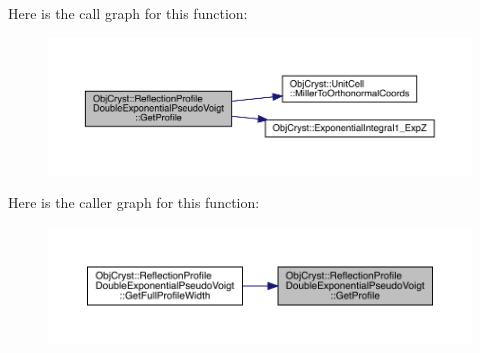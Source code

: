 Here is the call graph for this function\+:
\nopagebreak
\begin{figure}[H]
\begin{center}
\leavevmode
\includegraphics[width=350pt]{class_obj_cryst_1_1_reflection_profile_double_exponential_pseudo_voigt_a4673785fae1ffdcc0a9c2402e8c4af8b_cgraph}
\end{center}
\end{figure}
Here is the caller graph for this function\+:
\nopagebreak
\begin{figure}[H]
\begin{center}
\leavevmode
\includegraphics[width=350pt]{class_obj_cryst_1_1_reflection_profile_double_exponential_pseudo_voigt_a4673785fae1ffdcc0a9c2402e8c4af8b_icgraph}
\end{center}
\end{figure}
\mbox{\label{class_obj_cryst_1_1_reflection_profile_double_exponential_pseudo_voigt_a056c4179927ced1e55e3529fe54696f6}} 
